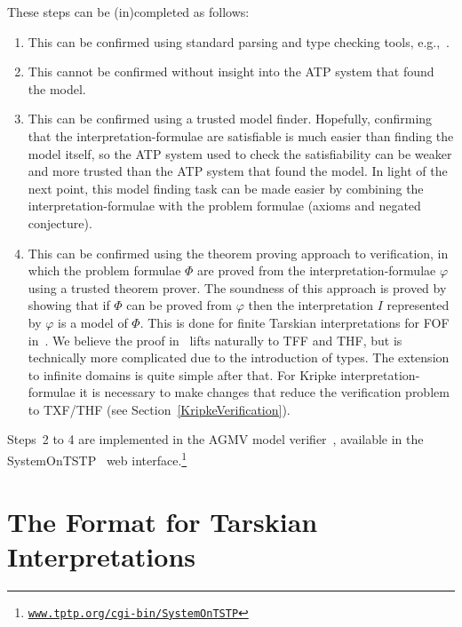 \documentclass{easychair}
\begin{document}
These steps can be (in)completed as follows:
\begin{enumerate}
\item This can be confirmed using standard parsing and type checking tools, 
      e.g.,~\cite{VS06,HR15,Ste26}.
\item This cannot be confirmed without insight into the ATP system that found the model.
\item This can be confirmed using a trusted model finder.
      Hopefully, confirming that the interpretation-formulae are satisfiable is much easier than 
      finding the model itself, so the ATP system used to check the satisfiability can be weaker 
      and more trusted than the ATP system that found the model.
      In light of the next point, this model finding task can be made easier by combining the
      interpretation-formulae with the problem formulae (axioms and negated conjecture).
\item This can be confirmed using the theorem proving approach to verification, in which the 
      problem formulae $\Phi$ are proved from the interpretation-formulae $\varphi$ using a trusted 
      theorem prover.
      The soundness of this approach is proved by showing that if $\Phi$ can be proved from 
      $\varphi$ then the interpretation $I$ represented by $\varphi$ is a model of $\Phi$.
      This is done for finite Tarskian interpretations for FOF in~\cite{SS+23-LPAR}.
      We believe the proof in~\cite{SS+23-LPAR} lifts naturally to TFF and THF, but is technically 
      more complicated due to the introduction of types.
      The extension to infinite domains is quite simple after that.
      For Kripke interpretation-formulae it is necessary to make changes that reduce the
      verification problem to TXF/THF (see Section~\ref{KripkeVerification}).
\end{enumerate}

Steps~2 to 4 are implemented in the AGMV model verifier~\cite{SS+23-LPAR}, available in the
SystemOnTSTP~\cite{Sut07-CSR} web interface.\footnote{%
\href{https://www.tptp.org/cgi-bin/SystemOnTSTP}{\tt www.tptp.org/cgi-bin/SystemOnTSTP}}
      
\section{The Format for Tarskian Interpretations}
\label{NewTarskian}
\end{document}
